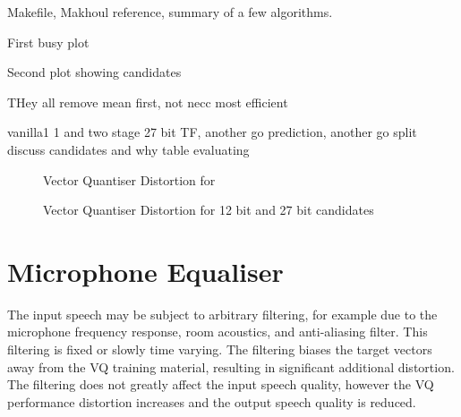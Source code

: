 \documentclass{article}
\begin{document}
Makefile, \cite{makhoul1985vector} Makhoul reference, summary of a few algorithms.

First busy plot

Second plot showing candidates

THey all remove mean first, not necc most efficient

vanilla1 1 and two stage
27 bit
TF, another go
prediction, another go
split
discuss candidates and why
table evaluating

\begin{figure}[h]
\caption{Vector Quantiser Distortion for }
\label{fig:train_ratek}
\begin{center}

\end{center}
\end{figure}

\begin{figure}[h]
\caption{Vector Quantiser Distortion for 12 bit and 27 bit candidates}
\label{fig:train_ratek1}
\begin{center}

\end{center}
\end{figure}

\section{Microphone Equaliser}

The input speech may be subject to arbitrary filtering, for example due to the microphone frequency response, room acoustics, and anti-aliasing filter.  This filtering is fixed or slowly time varying.  The filtering biases the target vectors away from the VQ training material, resulting in significant additional distortion.  The filtering does not greatly affect the input speech quality, however the VQ performance distortion increases and the output speech quality is reduced.
\end{document}
